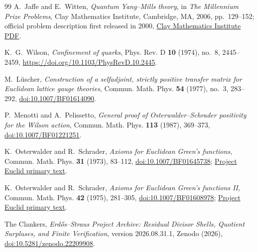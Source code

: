 \begin{thebibliography}{99}
A.~Jaffe and E.~Witten,
\emph{Quantum Yang--Mills theory}, in
\emph{The Millennium Prize Problems}, Clay Mathematics Institute,
Cambridge, MA, 2006, pp.~129--152; official problem description first
released in 2000,
\href{https://www.claymath.org/wp-content/uploads/2022/06/yangmills.pdf}%
{Clay Mathematics Institute PDF}.

\begingroup
\setlength{\emergencystretch}{3em}
\sloppy
K.~G.~Wilson,
\emph{Confinement of quarks},
Phys. Rev. D \textbf{10} (1974), no.~8, 2445--2459,
\url{https://doi.org/10.1103/PhysRevD.10.2445}.
\par\endgroup

M.~L\"uscher,
\emph{Construction of a selfadjoint, strictly positive transfer matrix for
Euclidean lattice gauge theories},
Commun. Math. Phys. \textbf{54} (1977), no.~3, 283--292,
\href{https://doi.org/10.1007/BF01614090}{doi:10.1007/BF01614090}.

P.~Menotti and A.~Pelissetto,
\emph{General proof of Osterwalder--Schrader positivity for the Wilson
action},
Commun. Math. Phys. \textbf{113} (1987), 369--373,
\href{https://doi.org/10.1007/BF01221251}{doi:10.1007/BF01221251}.

K.~Osterwalder and R.~Schrader,
\emph{Axioms for Euclidean Green's functions},
Commun. Math. Phys. \textbf{31} (1973), 83--112,
\href{https://doi.org/10.1007/BF01645738}{doi:10.1007/BF01645738};
\href{https://projecteuclid.org/euclid.cmp/1103858969}%
{Project Euclid primary text}.

K.~Osterwalder and R.~Schrader,
\emph{Axioms for Euclidean Green's functions II},
Commun. Math. Phys. \textbf{42} (1975), 281--305,
\href{https://doi.org/10.1007/BF01608978}{doi:10.1007/BF01608978};
\href{https://projecteuclid.org/euclid.cmp/1103899050}%
{Project Euclid primary text}.

The Clankers,
\emph{Erd\H{o}s--Straus Project Archive: Residual Divisor Shells, Quotient
Surpluses, and Finite Verification}, version 2026.08.31.1, Zenodo (2026),
\href{https://doi.org/10.5281/zenodo.22209908}%
{doi:10.5281/zenodo.22209908}.

\end{thebibliography}
